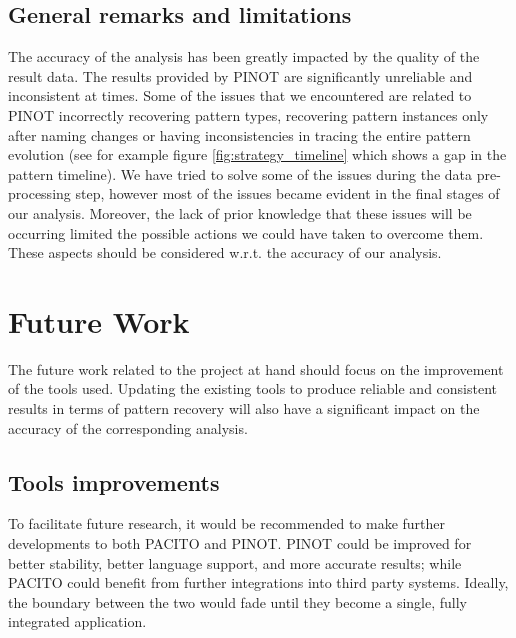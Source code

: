 \subsection{General remarks and limitations}
The accuracy of the analysis has been greatly impacted by the quality of the result data. The results provided by PINOT are significantly unreliable and inconsistent at times. Some of the issues that we encountered are related to PINOT incorrectly recovering pattern types, recovering pattern instances only after naming changes or having inconsistencies in tracing the entire pattern evolution (see for example figure \ref{fig:strategy_timeline} which shows a gap in the pattern timeline). We have tried to solve some of the issues during the data pre-processing step, however most of the issues became evident in the final stages of our analysis. Moreover, the lack of prior knowledge that these issues will be occurring limited the possible actions we could have taken to overcome them. These aspects should be considered w.r.t. the accuracy of our analysis.   

\newpage
\section{Future Work}
\label{sec:futurework}

The future work related to the project at hand should focus on the improvement of the tools used. Updating the existing tools to produce reliable and consistent results in terms of pattern recovery will also have a significant impact on the accuracy of the corresponding analysis.

\subsection{Tools improvements}
To facilitate future research, it would be recommended to make further developments to both PACITO and PINOT. PINOT could be improved for better stability, better language support, and more accurate results; while PACITO could benefit from further integrations into third party systems. Ideally, the boundary between the two would fade until they become a single, fully integrated application.


